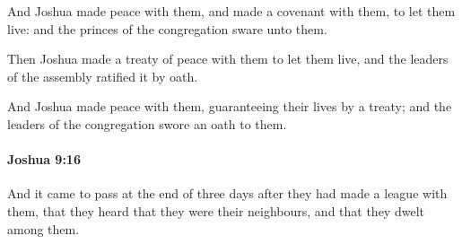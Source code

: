 			\begin{versebox}
					\item[BHS] 
					\item[ASV] And Joshua made peace with them, and made a covenant with them, to let them live: and the princes of the congregation sware unto them.
					\item[NIV] Then Joshua made a treaty of peace with them to let them live, and the leaders of the assembly ratified it by oath.
					\item[NRSV] And Joshua made peace with them, guaranteeing their lives by a treaty; and the leaders of the congregation swore an oath to them.
			\end{versebox}

		\paragraph{Joshua 9:16} %
			\label{JOSHUA-9-16}

			And it came to pass at the end of three days after they had made a league with them, that they heard that they were their neighbours, and that they dwelt among them.

